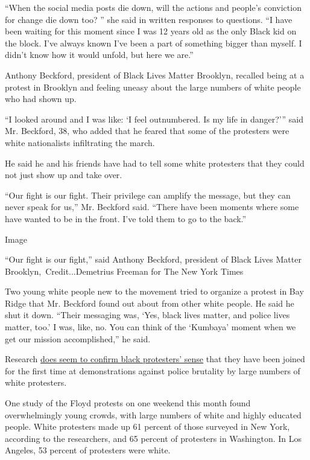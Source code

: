 ``When the social media posts die down, will the actions and people's
conviction for change die down too? '' she said in written responses to
questions. ``I have been waiting for this moment since I was 12 years
old as the only Black kid on the block. I've always known I've been a
part of something bigger than myself. I didn't know how it would unfold,
but here we are.''

Anthony Beckford, president of Black Lives Matter Brooklyn, recalled
being at a protest in Brooklyn and feeling uneasy about the large
numbers of white people who had shown up.

``I looked around and I was like: `I feel outnumbered. Is my life in
danger?''' said Mr. Beckford, 38, who added that he feared that some of
the protesters were white nationalists infiltrating the march.

He said he and his friends have had to tell some white protesters that
they could not just show up and take over.

``Our fight is our fight. Their privilege can amplify the message, but
they can never speak for us,'' Mr. Beckford said. ``There have been
moments where some have wanted to be in the front. I've told them to go
to the back.''

Image

``Our fight is our fight,'' said Anthony Beckford, president of Black
Lives Matter Brooklyn,~Credit...Demetrius Freeman for The New York Times

Two young white people new to the movement tried to organize a protest
in Bay Ridge that Mr. Beckford found out about from other white people.
He said he shut it down. ``Their messaging was, `Yes, black lives
matter, and police lives matter, too.' I was, like, no. You can think of
the `Kumbaya' moment when we get our mission accomplished,'' he said.

Research
\href{https://www.nytimes3xbfgragh.onion/2020/06/12/us/george-floyd-white-protesters.html}{does
seem to confirm black protesters' sense} that they have been joined for
the first time at demonstrations against police brutality by large
numbers of white protesters.

One study of the Floyd protests on one weekend this month found
overwhelmingly young crowds, with large numbers of white and highly
educated people. White protesters made up 61 percent of those surveyed
in New York, according to the researchers, and 65 percent of protesters
in Washington. In Los Angeles, 53 percent of protesters were white.

